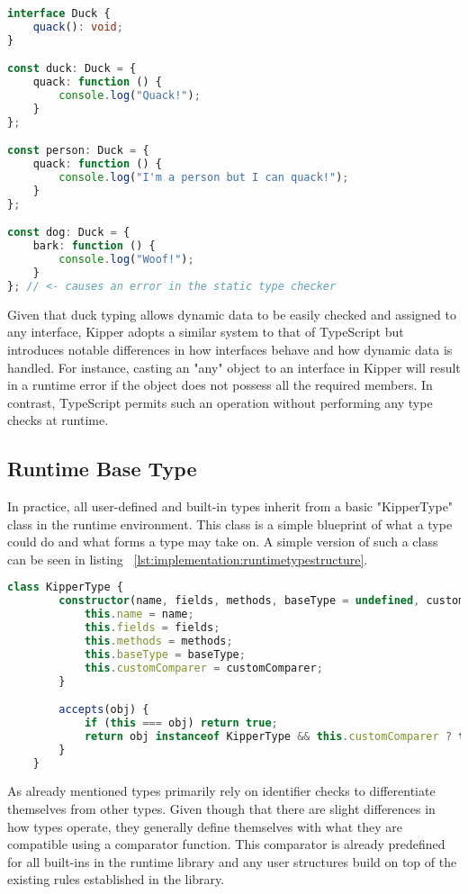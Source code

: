 \begin{lstlisting}[language=Typescript,caption=Example of duck typing in TypeScript,label=lst:implementation:javascriptducktyping]
interface Duck {
	quack(): void;
}

const duck: Duck = {
	quack: function () {
		console.log("Quack!");
	}
};

const person: Duck = {
	quack: function () {
		console.log("I'm a person but I can quack!");
	}
};

const dog: Duck = {
	bark: function () {
		console.log("Woof!");
	}
}; // <- causes an error in the static type checker
\end{lstlisting}

Given that duck typing allows dynamic data to be easily checked and assigned to any interface, Kipper adopts a similar system to that of TypeScript but introduces notable differences in how interfaces behave and how dynamic data is handled. For instance, casting an "any" object to an interface in Kipper will result in a runtime error if the object does not possess all the required members. In contrast, TypeScript permits such an operation without performing any type checks at runtime.

\subsection{Runtime Base Type}
\label{subsec:basetype}

In practice, all user-defined and built-in types inherit from a basic "KipperType" class in the runtime environment. This class is a simple blueprint of what a type could do and what forms a type may take on. A simple version of such a class can be seen in listing ~\ref{lst:implementation:runtimetypestructure}.

\begin{lstlisting}[language=TypeScript,caption=The structure of a runtime type,label=lst:implementation:runtimetypestructure]
	class KipperType {
		constructor(name, fields, methods, baseType = undefined, customComparer = undefined) {
			this.name = name;
			this.fields = fields;
			this.methods = methods;
			this.baseType = baseType;
			this.customComparer = customComparer;
		}

		accepts(obj) {
			if (this === obj) return true;
			return obj instanceof KipperType && this.customComparer ? this.customComparer(this, obj) : false;
		}
	}
\end{lstlisting}

As already mentioned types primarily rely on identifier checks to differentiate themselves from other types. Given though that there are slight differences in how types operate, they generally define themselves with what they are compatible using a comparator function. This comparator is already predefined for all built-ins in the runtime library and any user structures build on top of the existing rules established in the library.

